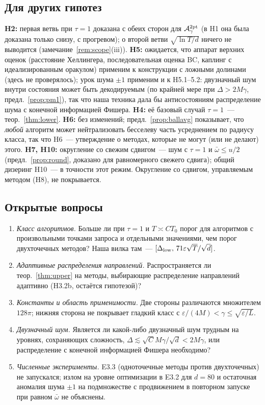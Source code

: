 \documentclass[11pt,a4paper]{article}
\numberwithin{equation}{section}
\theoremstyle{definition}
\theoremstyle{remark}
\newcommand{\wbar}{\bar\omega}\newcommand{\Atwo}{\cA^{\rm 2pt}_\gamma}
\begin{document}
\subsection{Для других гипотез}
\textbf{H2:} первая ветвь при $\tau=1$ доказана с обеих сторон для $\Atwo$ (в H1 она была доказана только снизу, с прогревом); о второй ветви $\sqrt{\ln T/d}$ ничего не выводится (замечание~\ref{rem:scope}(iii)). \textbf{H5:} ожидается, что аппарат верхних оценок (расстояние Хеллингера, последовательная оценка BC, каплинг с идеализированным оракулом) применим к конструкции с ложными долинами (здесь не проверялось); урок шума $\pm1$ применим и к H5.1--5.2: двузначный шум внутри состояния может быть декодируемым (по крайней мере при $\Delta>2M\gamma$, предл.~\ref{prop:pm1}), так что наша техника дала бы антисостояниям распределение шума с конечной информацией Фишера. \textbf{H4:} её базовый случай $\tau=1$~--- теор.~\ref{thm:lower}. \textbf{H6:} без изменений; предл.~\ref{prop:ballavg} показывает, что \emph{любой} алгоритм может нейтрализовать бесселеву часть усреднением по радиусу класса, так что H6~--- утверждение о методах, которые не могут (или не делают) этого. \textbf{H7, H10:} округление со свежим сдвигом~--- шум с $\tau=1$ и $\wbar\le u/2$ (предл.~\ref{prop:round}, доказано для равномерного свежего сдвига); общий дизеринг H10~--- в точности этот режим. Округление со сдвигом, управляемым методом (H8), не покрывается.

\subsection{Открытые вопросы}
\begin{enumerate}
\item \emph{Класс алгоритмов.} Больше ли при $\tau=1$ и $T\asymp CT_0$ порог для алгоритмов с произвольными точками запроса и отдельными значениями, чем порог двухточечных методов? Наша вилка там~--- $[\Delta_{\rm low},\,71\varepsilon\sqrt T/\sqrt d]$.
\item \emph{Адаптивные распределения направлений.} Распространяется ли теор.~\ref{thm:upper} на методы, выбирающие распределение направлений адаптивно (H3.2b, остаётся гипотезой)?
\item \emph{Константы и область применимости.} Две стороны различаются множителем $128\pi$; нижняя сторона не покрывает гладкий класс с $\varepsilon/(4M)<\gamma\le\sqrt{\varepsilon/L}$.
\item \emph{Двузначный шум.} Является ли какой-либо двузначный шум трудным на уровнях, сохраняющих сложность, $\Delta\lesssim\sqrt C M\gamma/\sqrt d<2M\gamma$, или распределение с конечной информацией Фишера необходимо?
\item \emph{Численные эксперименты.} E3.3 (одноточечные методы против двухточечных) не запускался; излом на уровне оптимизации в E3.2 для $d=80$ и остаточная аномалия шума $\pm1$ на подмножестве с продвижением в повторном запуске при равном $\wbar$ не объяснены.
\end{enumerate}
\end{document}
